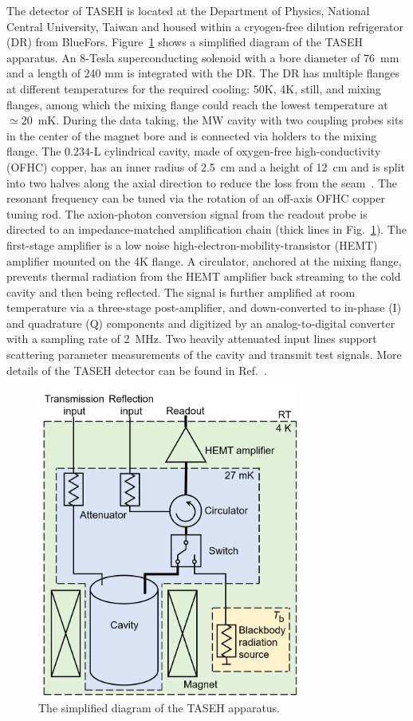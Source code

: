 \documentclass[%
 reprint,prl, %
superscriptaddress,
nobibnotes,
 amsmath,amssymb,
 aps,
]{revtex4-2}
\begin{document}
The detector of TASEH is located at the Department of Physics, National 
Central University, Taiwan and housed within a cryogen-free 
dilution refrigerator (DR) from BlueFors. 
Figure~\ref{fig:TASEH} shows a simplified diagram of the TASEH apparatus. 
An 8-Tesla 
superconducting solenoid with a 
bore diameter of 76~mm and a length of 240 mm is integrated with the DR.  
The DR has multiple flanges at different temperatures for 
the required cooling: 50K, 4K, still, 
and mixing flanges, among which the mixing flange could reach the lowest 
temperature at $\simeq20$~mK. 
%
During the data taking, the MW cavity with two coupling probes 
sits in the center of the magnet bore 
and is connected via holders to the mixing flange. 
The $0.234$-L cylindrical cavity, 
made of oxygen-free high-conductivity (OFHC) copper, 
has an inner radius of 2.5~cm and a height of 12~cm and 
 is split into two halves along the axial direction to reduce the loss from 
the seam~\cite{CAPPCavity}. 
The resonant frequency can be tuned via the rotation of an off-axis OFHC 
copper tuning rod. 
The axion-photon conversion signal from the readout probe is directed to an 
impedance-matched amplification chain (thick lines in Fig.~\ref{fig:TASEH}). 
The first-stage amplifier is a low noise high-electron-mobility-transistor 
(HEMT) amplifier mounted on the 4K flange. 
A circulator, anchored at the mixing flange, 
prevents thermal radiation from the HEMT amplifier back 
streaming to the cold cavity and then being reflected.  
The signal is further amplified at room temperature via a 
three-stage post-amplifier, and down-converted 
to in-phase (I) and quadrature (Q) components and digitized 
by an analog-to-digital converter with a sampling rate of 2~MHz. 
Two heavily attenuated input 
lines support scattering parameter measurements of the cavity and transmit 
test signals. 
More details of the TASEH detector can be found 
in Ref.~\cite{TASEHInstrumentation}. 

\begin{figure} 
  \centering
  \includegraphics[width=8.6cm]{figures/colored_Simplified_wiring_V3.png}
  \caption{%
The simplified diagram of the TASEH apparatus.}
  \label{fig:TASEH}
\end{figure}
\end{document}
